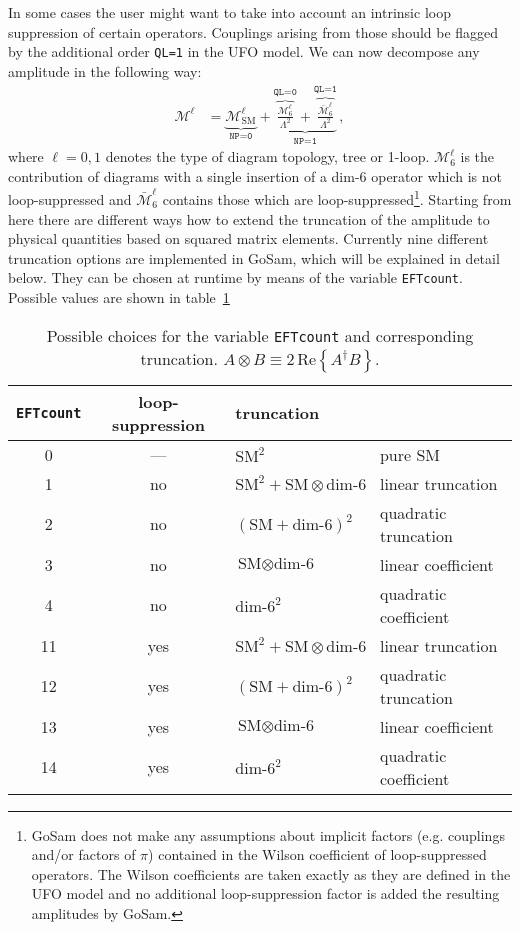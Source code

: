 \documentclass[11pt,a4paper]{refrep}
\newcommand{\gosam}{{\sc GoSam}\xspace}
\def\M{\mathcal{M}}
\begin{document}
In some cases the user might want to take into account an intrinsic loop suppression of certain operators. Couplings arising from those should be flagged by the additional order \texttt{QL=1} in the UFO model. We can now decompose any amplitude in the following way:
\begin{align}
   \M^\ell &= \underbrace{\M^\ell_\mathrm{SM}}_{\displaystyle\texttt{NP=0}} + \underbrace{\overbrace{\frac{\M^\ell_6}{\Lambda^2}}^{\displaystyle\texttt{QL=0}}  + \overbrace{\frac{\bar{\M}^\ell_6}{\Lambda^2}}^{\displaystyle\texttt{QL=1}}}_{\displaystyle\texttt{NP=1}}\,,
\end{align}
where $\ell=0,1$ denotes the type of diagram topology, tree or 1-loop. $\M^\ell_6$ is the contribution of diagrams with a single insertion of a dim-6 operator which is not loop-suppressed and $\bar{\M}^\ell_6$ contains those which are loop-suppressed\footnote{\gosam does not make any assumptions about implicit factors (e.g. couplings and/or factors of $\pi$) contained in the Wilson coefficient of loop-suppressed operators. The Wilson coefficients are taken exactly as they are defined in the UFO model and no additional loop-suppression factor is added the resulting amplitudes by \gosam.}. Starting from here there are different ways how to extend the truncation of the amplitude to physical quantities based on squared matrix elements. Currently nine different truncation options are implemented in GoSam, which will be explained in detail below. They can be chosen at runtime by means of the variable \texttt{EFTcount}. Possible values are shown in table~\ref{tab:EFTcount}

\begin{table}
\renewcommand{\arraystretch}{1.5}
\begin{tabular}{c|c|l|l}
   \texttt{EFTcount} & loop-suppression & truncation & \\
\hline
   0 & --- & $\text{SM}^2$ & pure SM\\
\hline
   1 & no & $\text{SM}^2 + \text{SM}\otimes\text{dim-6}$ & linear truncation\\
   2 & no & $\left(\text{SM}+\text{dim-6}\right)^2$ & quadratic truncation\\
   3 & no & $\text{SM}\otimes\text{dim-6}$ & linear coefficient\\
   4 & no & $\text{dim-6}^2$ & quadratic coefficient\\
\hline
   11 & yes & $\text{SM}^2 + \text{SM}\otimes\text{dim-6}$ & linear truncation\\
   12 & yes & $\left(\text{SM}+\text{dim-6}\right)^2$ & quadratic truncation\\
   13 & yes & $\text{SM}\otimes\text{dim-6}$ & linear coefficient\\
   14 & yes & $\text{dim-6}^2$ & quadratic coefficient
\end{tabular}
\caption{Possible choices for the variable \texttt{EFTcount} and corresponding truncation. $A\otimes B\equiv2\,\mathrm{Re}\left\{A^\dagger B\right\}$.}
\label{tab:EFTcount}
\renewcommand{\arraystretch}{1.0}
\end{table}
\end{document}
